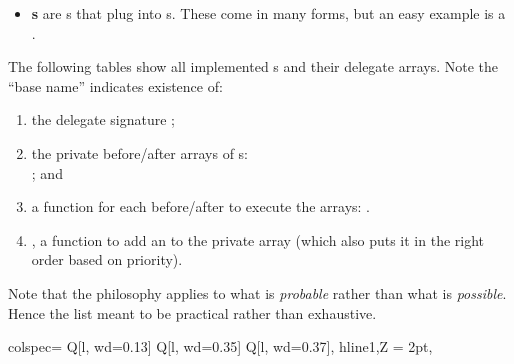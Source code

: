 \begin{itemize}
{\begin{center}
		\end{center}		 
		}
	\item{\textbf{s} are s that plug into s. These come in many forms, but an easy example is a . }
\end{itemize}


The following tables show all implemented s and their delegate arrays. Note the ``base name'' indicates existence of:

\begin{enumerate}
	\item{the delegate signature ;}
	\item{the private before/after arrays of s: \\; and}
	\item{a function for each before/after to execute the arrays: .}
	\item{, a function to add an  to the private array  (which also puts it in the right order based on priority).}
\end{enumerate}

\noindent Note that the philosophy applies to what is \textit{probable} rather than what is \textit{possible}. Hence the list meant to be practical rather than exhaustive.


\begin{longtblr}[
	caption = {\code{Outlet}s for \code{LevelComponent}},
	label = {delegate-arrays-levelcomponent},
]{
	colspec= {Q[l, wd=0.13\linewidth] Q[l, wd=0.35\linewidth] Q[l, wd=0.37\linewidth]},
	hline{1,Z} = {2pt},
}
	
\end{longtblr}


\newcommand{\DelegateSpace}{\hspace*{1em}$\blacktriangleright$}
\newcommand{\DelegateNote}{\hspace*{2em}\textit{Note:}}

